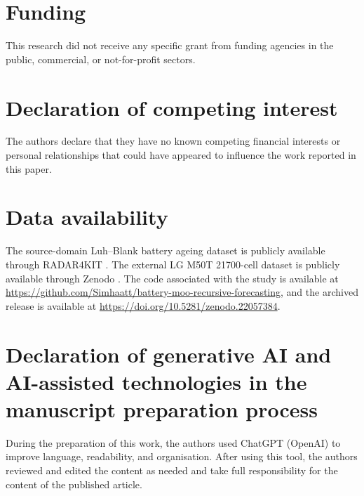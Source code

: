 \documentclass[a4paper,fleqn]{cas-sc}
\begin{document}

\section*{Funding}

This research did not receive any specific grant from funding agencies in the
public, commercial, or not-for-profit sectors.


\section*{Declaration of competing interest}

The authors declare that they have no known competing financial interests or
personal relationships that could have appeared to influence the work reported
in this paper.


\section*{Data availability}

The source-domain Luh--Blank battery ageing dataset is publicly available
through RADAR4KIT \cite{luh2024data}. The external LG M50T 21700-cell dataset
is publicly available through Zenodo \cite{kirkaldy2024data}. The code
associated with the study is available at
\url{https://github.com/Simhaatt/battery-moo-recursive-forecasting}, and the
archived release is available at
\url{https://doi.org/10.5281/zenodo.22057384}.


\section*{Declaration of generative AI and AI-assisted technologies in the manuscript preparation process}

During the preparation of this work, the authors used ChatGPT (OpenAI) to
improve language, readability, and organisation. After using this tool, the
authors reviewed and edited the content as needed and take full responsibility
for the content of the published article.
\end{document}
